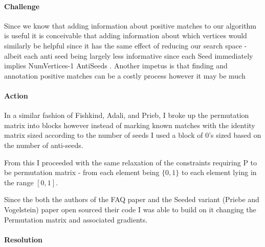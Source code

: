 \documentclass[12pt]{article}
\begin{document}
\paragraph{Challenge}

Since we know that adding information about positive matches to our algorithm is useful it is conceivable that adding information about which vertices would similarly be helpful since it has the same effect of reducing our search space - albeit each anti seed being largely less informative since each Seed immediately implies NumVertices-1 AntiSeeds . Another impetus is that finding and annotation positive matches can be a costly process however it may be much 

\paragraph{Action}

In a similar fashion of Fishkind,  Adali, and  Prieb, I  broke up the permutation matrix into blocks however instead of marking known matches with the identity matrix sized according to the number of seeds I used a block of 0's sized based on the number of anti-seeds. 

From this I proceeded with the same relaxation of the constraints requiring P to be permutation matrix - from each element being $\{0,1\}$ to each element lying in the range $[0,1]$.

Since the both the authors of the FAQ paper and the Seeded variant (Priebe and Vogelstein) paper open sourced their code I was able to build on it changing the Permutation matrix and associated gradients.

\paragraph{Resolution}
\end{document}
